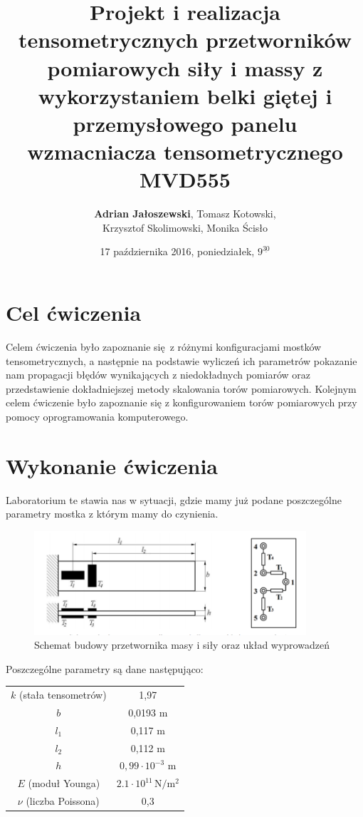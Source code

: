 \documentclass[a4paper, 12pt, titlepage]{article}
\title{Projekt i realizacja tensometrycznych przetworników pomiarowych siły i massy z wykorzystaniem belki giętej i przemysłowego panelu wzmacniacza tensometrycznego MVD555}
\author{\textbf{Adrian Jałoszewski}, Tomasz Kotowski,\\Krzysztof Skolimowski, Monika Ścisło}
\date{17 października 2016, poniedziałek, $9^{\underline{30}}$}
\begin{document}
	\maketitle
	\tableofcontents
	\newpage
	\section{Cel ćwiczenia}
		Celem ćwiczenia było zapoznanie się z różnymi konfiguracjami mostków tensometrycznych, a następnie na podstawie wyliczeń ich parametrów pokazanie nam propagacji błędów wynikających z niedokładnych pomiarów oraz przedstawienie dokładniejszej metody skalowania torów pomiarowych. Kolejnym celem ćwiczenie było zapoznanie się z konfigurowaniem torów pomiarowych przy pomocy oprogramowania komputerowego.
	\section{Wykonanie ćwiczenia}
		Laboratorium te stawia nas w sytuacji, gdzie mamy już podane poszczególne parametry mostka z którym mamy do czynienia. 
		\begin{figure}[H]
			\centering
			\includegraphics[width=0.9\textwidth]{img/schemat.png}
			\caption{\small{Schemat budowy przetwornika masy i siły oraz układ wyprowadzeń}}
		\end{figure}  \noindent
		Poszczególne parametry są dane następująco:
		\begin{center}
			\begin{tabular}{cc}
				$k$ (stała tensometrów) & 1,97 \\ 
				$b$ & 0,0193 m \\ 
				$l_1$ & 0,117 m \\ 
				$l_2$ & 0,112 m \\ 
				$h$ & $0,99 \cdot 10^{-3}$ m \\ 
				$E$ (moduł Younga) & $2.1 \cdot 10^{11} \, \mathrm{N/m^2}$ \\ 
				$\nu$ (liczba Poissona) & 0,3
			\end{tabular} 
		\end{center}
		
\end{document}
